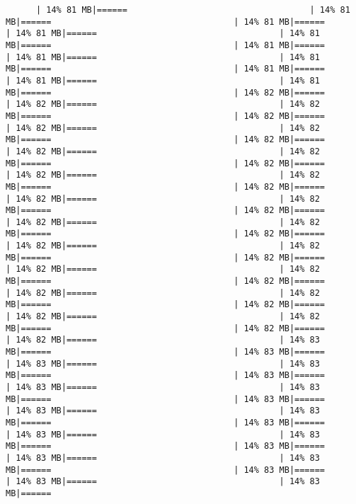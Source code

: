 \documentclass[
]{article}
\begin{document}
\begin{verbatim}
      | 14% 81 MB|======                                    | 14% 81 MB|======                                    | 14% 81 MB|======                                    | 14% 81 MB|======                                    | 14% 81 MB|======                                    | 14% 81 MB|======                                    | 14% 81 MB|======                                    | 14% 81 MB|======                                    | 14% 81 MB|======                                    | 14% 81 MB|======                                    | 14% 81 MB|======                                    | 14% 82 MB|======                                    | 14% 82 MB|======                                    | 14% 82 MB|======                                    | 14% 82 MB|======                                    | 14% 82 MB|======                                    | 14% 82 MB|======                                    | 14% 82 MB|======                                    | 14% 82 MB|======                                    | 14% 82 MB|======                                    | 14% 82 MB|======                                    | 14% 82 MB|======                                    | 14% 82 MB|======                                    | 14% 82 MB|======                                    | 14% 82 MB|======                                    | 14% 82 MB|======                                    | 14% 82 MB|======                                    | 14% 82 MB|======                                    | 14% 82 MB|======                                    | 14% 82 MB|======                                    | 14% 82 MB|======                                    | 14% 82 MB|======                                    | 14% 82 MB|======                                    | 14% 82 MB|======                                    | 14% 82 MB|======                                    | 14% 82 MB|======                                    | 14% 82 MB|======                                    | 14% 82 MB|======                                    | 14% 82 MB|======                                    | 14% 82 MB|======                                    | 14% 82 MB|======                                    | 14% 82 MB|======                                    | 14% 82 MB|======                                    | 14% 83 MB|======                                    | 14% 83 MB|======                                    | 14% 83 MB|======                                    | 14% 83 MB|======                                    | 14% 83 MB|======                                    | 14% 83 MB|======                                    | 14% 83 MB|======                                    | 14% 83 MB|======                                    | 14% 83 MB|======                                    | 14% 83 MB|======                                    | 14% 83 MB|======                                    | 14% 83 MB|======                                    | 14% 83 MB|======                                    | 14% 83 MB|======                                    | 14% 83 MB|======                                    | 14% 83 MB|======                                    | 14% 83 MB|======                                    | 14% 83 MB|======                                    | 14% 83 MB|====== 
\end{verbatim}
\end{document}

